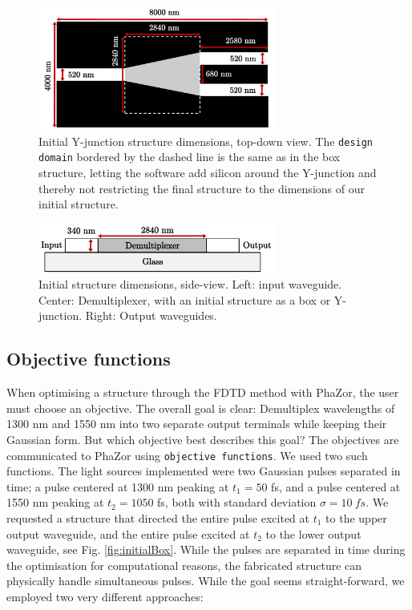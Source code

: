 \begin{figure}[h!]
    \centering
    \includegraphics[width=0.7\textwidth]
    {fig/design/initialYjunction.pdf}
    \caption{Initial Y-junction structure dimensions, top-down view. The \texttt{design domain} bordered by the dashed line is the same as in the box structure, letting the software add silicon around the Y-junction and thereby not restricting the final structure to the dimensions of our initial structure.}
    \label{fig:initialYjunction}
\end{figure}

\begin{figure}[h!]
    \centering
    \includegraphics[width=0.7\textwidth]
    {fig/design/initialside.pdf}
    \caption{Initial structure dimensions, side-view. Left: input waveguide. Center: Demultiplexer, with an initial structure as a box or Y-junction. Right: Output waveguides.}
    \label{fig:initialside}
\end{figure}

\subsection{Objective functions}
When optimising a structure through the FDTD method with PhaZor, the user must choose an objective. The overall goal is clear: Demultiplex wavelengths of 1300 nm and 1550 nm into two separate output terminals while keeping their Gaussian form. But which objective best describes this goal? The objectives are communicated to PhaZor using \texttt{objective functions}. We used two such functions. The light sources implemented were two Gaussian pulses separated in time; a pulse centered at 1300 nm peaking at $t_1= 50$ fs, and a pulse centered at 1550 nm peaking at $t_2 = 1050$ fs, both with standard deviation $\sigma=\SI{10}{fs}$. We requested a structure that directed the entire pulse excited at $t_1$ to the upper output waveguide, and the entire pulse excited at $t_2$ to the lower output waveguide, see Fig. \ref{fig:initialBox}. While the pulses are separated in time during the optimisation for computational reasons, the fabricated structure can physically handle simultaneous pulses. While the goal seems straight-forward, we employed two very different approaches:\\

